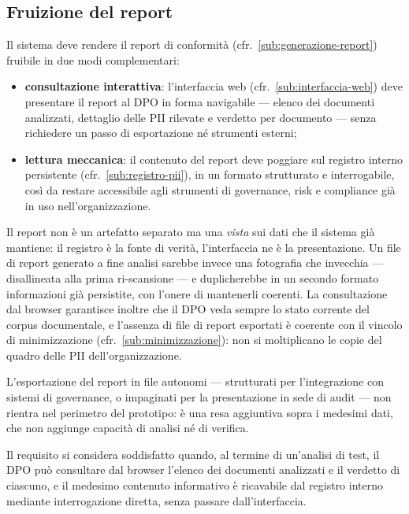 \subsection{Fruizione del report}
\label{sub:formato-output}
Il sistema deve rendere il report di conformità (cfr.~\ref{sub:generazione-report}) fruibile in due modi complementari:
\begin{itemize}
	\item \textbf{consultazione interattiva}: l'interfaccia web (cfr.~\ref{sub:interfaccia-web}) deve presentare il report al DPO in forma navigabile --- elenco dei documenti analizzati, dettaglio delle PII rilevate e verdetto per documento --- senza richiedere un passo di esportazione né strumenti esterni;
	\item \textbf{lettura meccanica}: il contenuto del report deve poggiare sul registro interno persistente (cfr.~\ref{sub:registro-pii}), in un formato strutturato e interrogabile, così da restare accessibile agli strumenti di governance, risk e compliance già in uso nell'organizzazione.
\end{itemize} \medskip

Il report non è un artefatto separato ma una \textit{vista} sui dati che il sistema già mantiene: il registro è la fonte di verità, l'interfaccia ne è la presentazione. Un file di report generato a fine analisi sarebbe invece una fotografia che invecchia --- disallineata alla prima ri-scansione --- e duplicherebbe in un secondo formato informazioni già persistite, con l'onere di mantenerli coerenti. La consultazione dal browser garantisce inoltre che il DPO veda sempre lo stato corrente del corpus documentale, e l'assenza di file di report esportati è coerente con il vincolo di minimizzazione (cfr.~\ref{sub:minimizzazione}): non si moltiplicano le copie del quadro delle PII dell'organizzazione. \medskip

L'esportazione del report in file autonomi --- strutturati per l'integrazione con sistemi di governance, o impaginati per la presentazione in sede di audit --- non rientra nel perimetro del prototipo: è una resa aggiuntiva sopra i medesimi dati, che non aggiunge capacità di analisi né di verifica. \medskip

Il requisito si considera soddisfatto quando, al termine di un'analisi di test, il DPO può consultare dal browser l'elenco dei documenti analizzati e il verdetto di ciascuno, e il medesimo contenuto informativo è ricavabile dal registro interno mediante interrogazione diretta, senza passare dall'interfaccia.
